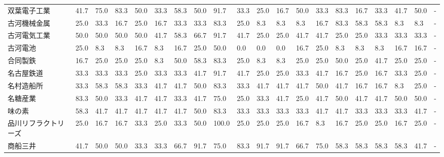 \documentclass[a4paper，11pt]{jsarticle}
\begin{document}
\begin{longtable}[c]{lp{3mm}p{3mm}p{3mm}p{3mm}p{3mm}p{3mm}p{3mm}p{3mm}p{3mm}p{3mm}p{3mm}p{3mm}p{3mm}p{3mm}p{3mm}p{3mm}p{3mm}p{3mm}p{3mm}}
双葉電子工業          &   41.7 &   75.0 &      83.3 &      50.0 &       33.3 &   58.3 &   50.0 &   91.7 &    33.3 &    25.0 &   16.7 &  50.0 &   33.3 &    83.3 &    16.7 &  33.3 &  41.7 &  50.0 &     - \\
古河機械金属          &   25.0 &   33.3 &      16.7 &      25.0 &       16.7 &   33.3 &   33.3 &   83.3 &    25.0 &     8.3 &    8.3 &   8.3 &   16.7 &    83.3 &    58.3 &  58.3 &   8.3 &   8.3 &     - \\
古河電気工業          &   50.0 &   50.0 &      50.0 &      50.0 &       41.7 &   58.3 &   66.7 &   91.7 &    41.7 &    25.0 &   25.0 &  41.7 &   41.7 &    25.0 &    25.0 &  33.3 &  33.3 &  33.3 &     - \\
古河電池            &   25.0 &    8.3 &       8.3 &      16.7 &        8.3 &   16.7 &   25.0 &   50.0 &     0.0 &     0.0 &    0.0 &  16.7 &   25.0 &     8.3 &     8.3 &   8.3 &  16.7 &  16.7 &     - \\
合同製鉄            &   16.7 &   25.0 &      25.0 &      25.0 &        8.3 &   50.0 &   58.3 &   83.3 &    25.0 &     8.3 &    8.3 &  25.0 &   25.0 &    50.0 &    25.0 &  41.7 &  25.0 &  25.0 &     - \\
名古屋鉄道           &   33.3 &   33.3 &      33.3 &      25.0 &       33.3 &   33.3 &   41.7 &   91.7 &    41.7 &    25.0 &   25.0 &  33.3 &   41.7 &    16.7 &    25.0 &  16.7 &  33.3 &  25.0 &     - \\
名村造船所           &   33.3 &   58.3 &      58.3 &      33.3 &       41.7 &   41.7 &   50.0 &   83.3 &    33.3 &    41.7 &   41.7 &  41.7 &   50.0 &    41.7 &    16.7 &  16.7 &   8.3 &  25.0 &     - \\
名糖産業            &   83.3 &   50.0 &      33.3 &      41.7 &       41.7 &   33.3 &   41.7 &   75.0 &    25.0 &    33.3 &   41.7 &  25.0 &   41.7 &    50.0 &    41.7 &  41.7 &  50.0 &  50.0 &     - \\
味の素             &   58.3 &   41.7 &      41.7 &      41.7 &       41.7 &   41.7 &   50.0 &   83.3 &    33.3 &    33.3 &   33.3 &  33.3 &   41.7 &    41.7 &    33.3 &  33.3 &  33.3 &  41.7 &     - \\
品川リフラクトリーズ      &   25.0 &   16.7 &      16.7 &      33.3 &       25.0 &   33.3 &   50.0 &  100.0 &    25.0 &    25.0 &   25.0 &  16.7 &    8.3 &    16.7 &    25.0 &  25.0 &  16.7 &  25.0 &     - \\
商船三井            &   41.7 &   50.0 &      50.0 &      33.3 &       33.3 &   66.7 &   91.7 &   75.0 &    83.3 &    91.7 &   91.7 &  66.7 &   75.0 &    58.3 &    58.3 &  58.3 &  58.3 &  41.7 &     - \\

\end{longtable}
\end{document}
